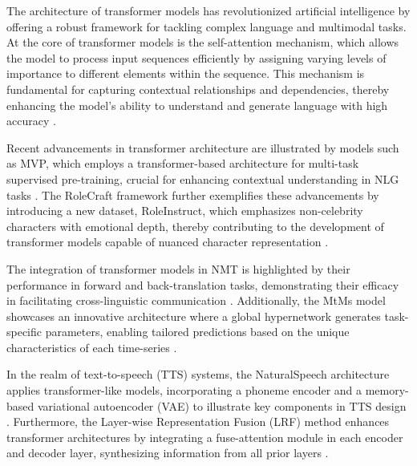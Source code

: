 The architecture of transformer models has revolutionized artificial intelligence by offering a robust framework for tackling complex language and multimodal tasks. At the core of transformer models is the self-attention mechanism, which allows the model to process input sequences efficiently by assigning varying levels of importance to different elements within the sequence. This mechanism is fundamental for capturing contextual relationships and dependencies, thereby enhancing the model's ability to understand and generate language with high accuracy \cite{tang2023mvpmultitasksupervisedpretraining}.



Recent advancements in transformer architecture are illustrated by models such as MVP, which employs a transformer-based architecture for multi-task supervised pre-training, crucial for enhancing contextual understanding in NLG tasks \cite{tang2023mvpmultitasksupervisedpretraining}. The RoleCraft framework further exemplifies these advancements by introducing a new dataset, RoleInstruct, which emphasizes non-celebrity characters with emotional depth, thereby contributing to the development of transformer models capable of nuanced character representation \cite{tao2024rolecraftglmadvancingpersonalizedroleplaying}.



The integration of transformer models in NMT is highlighted by their performance in forward and back-translation tasks, demonstrating their efficacy in facilitating cross-linguistic communication \cite{bogoychev2020domaintranslationesenoisesynthetic}. Additionally, the MtMs model showcases an innovative architecture where a global hypernetwork generates task-specific parameters, enabling tailored predictions based on the unique characteristics of each time-series \cite{stank2024designingtimeseriesmodelshypernetworks}.



In the realm of text-to-speech (TTS) systems, the NaturalSpeech architecture applies transformer-like models, incorporating a phoneme encoder and a memory-based variational autoencoder (VAE) to illustrate key components in TTS design \cite{tan2022naturalspeechendtoendtextspeech}. Furthermore, the Layer-wise Representation Fusion (LRF) method enhances transformer architectures by integrating a fuse-attention module in each encoder and decoder layer, synthesizing information from all prior layers \cite{zheng2023layerwiserepresentationfusioncompositional}.



